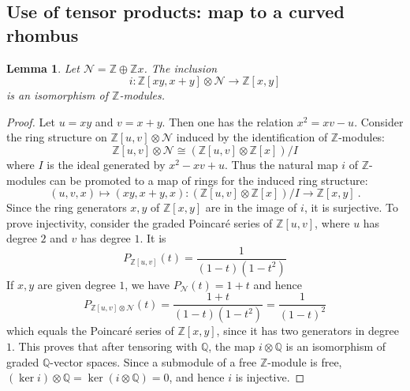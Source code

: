 \documentclass[a4paper,10pt]{amsart}
\newtheorem{lem}[thm]{Lemma}
\theoremstyle{definition}
\theoremstyle{remark}
\numberwithin{equation}{section}
\newcommand{\To}{\longrightarrow}
\newcommand{\Z}{\mathbb Z}
\newcommand{\Q}{\mathbb Q}
\newcommand{\0}{\color{blue}{\mathsf{0}}}
\begin{document}
  \subsection{Use of tensor products: map to a curved rhombus} 
  \begin{lem} \label{lem: isoZmodulesxyxplusy}  Let $\mathcal{N} = \Z\oplus \Z x$. The inclusion 
  \[  i: \Z[xy, x+y] \otimes \mathcal{N} \To \Z[x,y]\]
  is an isomorphism of $\Z$-modules.
  \end{lem} 
 \begin{proof} Let  $u = xy$ and $v =x+y$. Then one has the relation 
 $x^2 = xv - u$. Consider the ring structure on $ \Z[u ,v] \otimes \mathcal{N}$ induced by the  identification of  $\Z$-modules:
 \[ \Z[u ,v] \otimes \mathcal{N} \cong \left( \Z[u,v] \otimes \Z[x] \right)/I \]
 where $I$ is the ideal generated by $x^2-xv+u$. Thus the natural map $i$  of $\Z$-modules  can be promoted to a map of rings for the induced ring structure:
\[ (u,v,x) \mapsto (xy, x+y, x) :  \left( \Z[u,v] \otimes \Z[x] \right)/I \To \Z[x,y]\ .\]
 Since the ring generators $x, y$ of $\Z[x,y]$ are in the image of $i$, it  is surjective.
 To prove injectivity, consider the graded Poincar\'e series of $\Z[u,v]$, where $u$ has degree $2$ and $v$ has degree $1$. It is 
 \[ P_{\Z[u,v]} (t) =  \frac{1}{(1-t)(1-t^2)}\]
If $x,y$ are given degree $1$, we have $P_{\mathcal{N}}(t) = 1+t$ and hence
\[ P_{\Z[u,v] \otimes \mathcal{N}}(t) = \frac{1+t}{(1-t)(1-t^2)} = \frac{1}{(1-t)^2}\]
which equals the Poincar\'e series of $\Z[x,y]$, since it has two generators in degree $1$. This proves that after tensoring with $\Q$, the map $i\otimes \Q$ is an isomorphism of graded $\Q$-vector spaces. Since a submodule of a free $\Z$-module is free, $(\ker i)\otimes  \Q = \ker (i \otimes \Q) =0$, and hence $i$ is injective.
 \end{proof}
 
\end{document}
